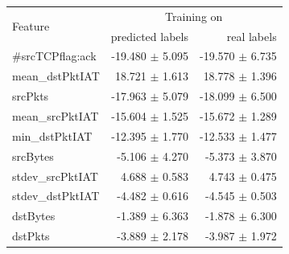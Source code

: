 \documentclass[sigconf,nonacm]{acmart}
\begin{document}
\begin{table}
\begin{tabular}{l r r}
\bottomrule
\end{tabular} \qquad
 \begin{tabular}{l r r} \toprule 
\multirow{2}{*}{Feature} & \multicolumn{2}{c}{Training on} \\
  & predicted labels & real labels \\ \midrule
    \#srcTCPflag:ack &  -19.480 $\pm$ 5.095 &  -19.570 $\pm$ 6.735 \\
     mean\_dstPktIAT &   18.721 $\pm$ 1.613 &   18.778 $\pm$ 1.396 \\
             srcPkts &  -17.963 $\pm$ 5.079 &  -18.099 $\pm$ 6.500 \\
     mean\_srcPktIAT &  -15.604 $\pm$ 1.525 &  -15.672 $\pm$ 1.289 \\
      min\_dstPktIAT &  -12.395 $\pm$ 1.770 &  -12.533 $\pm$ 1.477 \\
            srcBytes &   -5.106 $\pm$ 4.270 &   -5.373 $\pm$ 3.870 \\
    stdev\_srcPktIAT &    4.688 $\pm$ 0.583 &    4.743 $\pm$ 0.475 \\
    stdev\_dstPktIAT &   -4.482 $\pm$ 0.616 &   -4.545 $\pm$ 0.503 \\
            dstBytes &   -1.389 $\pm$ 6.363 &   -1.878 $\pm$ 6.300 \\
             dstPkts &   -3.889 $\pm$ 2.178 &   -3.987 $\pm$ 1.972 \\

\end{tabular}
\end{table}
\end{document}
